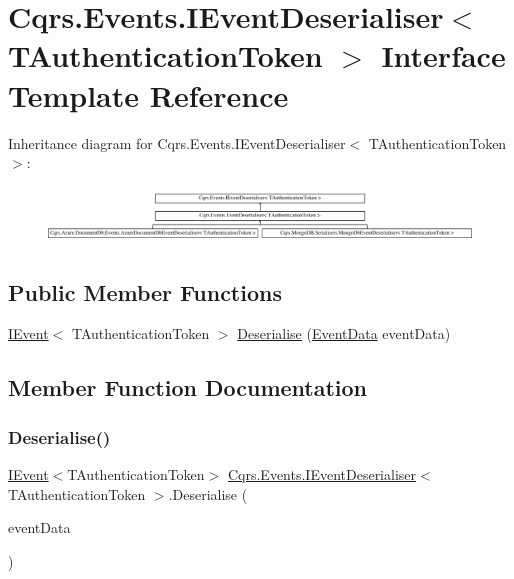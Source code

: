 \hypertarget{interfaceCqrs_1_1Events_1_1IEventDeserialiser}{}\section{Cqrs.\+Events.\+I\+Event\+Deserialiser$<$ T\+Authentication\+Token $>$ Interface Template Reference}
\label{interfaceCqrs_1_1Events_1_1IEventDeserialiser}
Inheritance diagram for Cqrs.\+Events.\+I\+Event\+Deserialiser$<$ T\+Authentication\+Token $>$\+:\begin{figure}[H]
\begin{center}
\leavevmode
\includegraphics[height=1.508079cm]{interfaceCqrs_1_1Events_1_1IEventDeserialiser}
\end{center}
\end{figure}
\subsection*{Public Member Functions}
\begin{DoxyCompactItemize}
\item 
\hyperlink{interfaceCqrs_1_1Events_1_1IEvent}{I\+Event}$<$ T\+Authentication\+Token $>$ \hyperlink{interfaceCqrs_1_1Events_1_1IEventDeserialiser_af9216046631ed941bb96b58a0cc27f22_af9216046631ed941bb96b58a0cc27f22}{Deserialise} (\hyperlink{classCqrs_1_1Events_1_1EventData}{Event\+Data} event\+Data)
\end{DoxyCompactItemize}


\subsection{Member Function Documentation}
\mbox{\label{interfaceCqrs_1_1Events_1_1IEventDeserialiser_af9216046631ed941bb96b58a0cc27f22_af9216046631ed941bb96b58a0cc27f22}} 
\subsubsection{\texorpdfstring{Deserialise()}{Deserialise()}}
{\footnotesize\ttfamily \hyperlink{interfaceCqrs_1_1Events_1_1IEvent}{I\+Event}$<$T\+Authentication\+Token$>$ \hyperlink{interfaceCqrs_1_1Events_1_1IEventDeserialiser}{Cqrs.\+Events.\+I\+Event\+Deserialiser}$<$ T\+Authentication\+Token $>$.Deserialise (\begin{DoxyParamCaption}\item[{\hyperlink{classCqrs_1_1Events_1_1EventData}{Event\+Data}}]{event\+Data }\end{DoxyParamCaption})}



